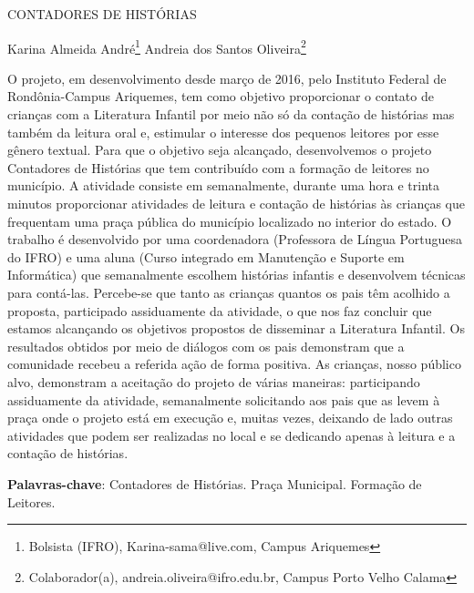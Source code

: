 \documentclass[article,12pt,onesidea,4paper,english,brazil]{abntex2}
\begin{document}
	
	
	\frenchspacing 
	
	\begin{center}
		\LARGE CONTADORES DE HISTÓRIAS
		
		\normalsize
		Karina Almeida André\footnote{Bolsista (IFRO), Karina-sama@live.com, Campus Ariquemes} 
		Andreia dos Santos Oliveira\footnote{Colaborador(a), andreia.oliveira@ifro.edu.br, Campus Porto Velho Calama} 
		
	\end{center}
	
	\noindent O projeto, em desenvolvimento desde março de 2016, pelo Instituto Federal de Rondônia-Campus Ariquemes, tem como objetivo proporcionar o contato de crianças com a Literatura Infantil por meio não só da contação de histórias mas também da leitura oral e, estimular o interesse dos pequenos leitores por esse gênero textual. Para que o objetivo seja alcançado, desenvolvemos o projeto Contadores de Histórias que tem contribuído com a formação de leitores no município. A atividade consiste em semanalmente, durante uma hora e trinta minutos proporcionar atividades de leitura e contação de histórias às crianças que frequentam uma praça pública do município localizado no interior do estado. O trabalho é desenvolvido por uma coordenadora (Professora de Língua Portuguesa do IFRO) e uma aluna (Curso integrado em Manutenção e Suporte em Informática) que semanalmente escolhem histórias infantis e desenvolvem técnicas para contá-las. Percebe-se que tanto as crianças quantos os pais têm acolhido a proposta, participado assiduamente da atividade, o que nos faz concluir que estamos alcançando os objetivos propostos de disseminar a Literatura Infantil. Os resultados obtidos por meio de diálogos com os pais demonstram que a comunidade recebeu a referida ação de forma positiva. As crianças, nosso público alvo, demonstram a aceitação do projeto de várias maneiras: participando assiduamente da atividade, semanalmente solicitando aos pais que as levem à praça onde o projeto está em execução e, muitas vezes, deixando de lado outras atividades que podem ser realizadas no local e se dedicando apenas à leitura e a contação de histórias.
	
	\vspace{\onelineskip}
	
	\noindent
	\textbf{Palavras-chave}: Contadores de Histórias. Praça Municipal. Formação de Leitores.
	
\end{document}
